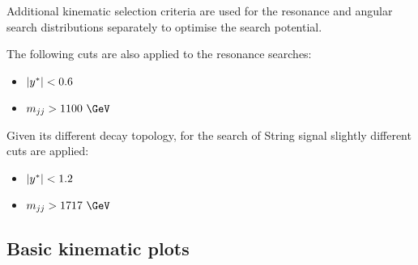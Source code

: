 Additional kinematic selection criteria are used for the resonance and
angular search distributions separately to optimise the search
potential.


The following cuts are also applied to the  resonance searches:
\begin{itemize}
\item $|y^\ast| < 0.6$
\item $\mjj > 1100~\GeV$
\end{itemize}

Given its different decay topology, for the search of String signal slightly different cuts are applied:
\begin{itemize}
\item $|y^\ast| < 1.2$
\item $\mjj > 1717~\GeV$
\end{itemize}




\subsection{Basic kinematic plots}
\label{sec:kinematic_distributions}

